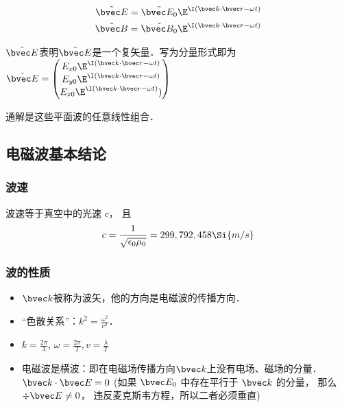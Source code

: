 \begin{align}
\tilde {\bvec E} = \tilde {\bvec E_0} \E^{\I(\bvec k \cdot \bvec r - \omega t)}\\
\tilde {\bvec B} = \tilde {\bvec B_0} \E^{\I(\bvec k \cdot \bvec r - \omega t)}\\
\end{align}

$\tilde {\bvec E}$表明$\tilde {\bvec E}$是一个复矢量．写为分量形式即为 
$\tilde {\bvec E} = 
\begin{pmatrix}
E_{x0} \E^{\I(\bvec k \cdot \bvec r - \omega t)}\\
E_{y0} \E^{\I(\bvec k \cdot \bvec r - \omega t)}\\
E_{z0} \E^{\I(\bvec k \cdot \bvec r - \omega t)})\\
\end{pmatrix}
$

通解是这些平面波的任意线性组合． 

\subsection{电磁波基本结论}
\subsubsection{波速}
波速等于真空中的光速 $c$， 且
\begin{equation}\label{VcPlWv_eq1}
c = \frac{1}{\sqrt{\epsilon_0\mu_0}} = 299,792,458 \Si{m/s}
\end{equation}

\subsubsection{波的性质}
\begin{itemize}
\item $\bvec k$被称为波矢，他的方向是电磁波的传播方向．
\item  “色散关系”：$k^2=\frac{\omega^2}{c^2}$．
\item $k=\frac{2\pi}{\lambda}$, $\omega=\frac{2\pi}{T}, v=\frac{\lambda}{T}$
\item 电磁波是横波：即在电磁场传播方向$\bvec k$上没有电场、磁场的分量．$\bvec k \cdot \bvec E = 0$ (如果 $\bvec E_0$ 中存在平行于 $\bvec k$ 的分量， 那么 $\div \bvec E \ne 0$， 违反麦克斯韦方程，所以二者必须垂直)
\end{itemize}

